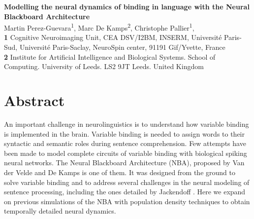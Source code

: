 \documentclass[10pt]{article}
\date{}
\begin{document}
\vspace*{0.2in}

\begin{flushleft} {\LARGE \textbf{Modelling the neural dynamics of
      binding in language with the Neural Blackboard Architecture} }
  \newline
  \\

  Martin Perez-Guevara\textsuperscript{1}, Marc De
  Kamps\textsuperscript{2}, Christophe Pallier\textsuperscript{1},
  \\
  \bigskip \textbf{1} Cognitive Neuroimaging Unit, CEA DSV/I2BM,
  INSERM, Université Paris-Sud, Université Paris-Saclay, NeuroSpin
  center, 91191 Gif/Yvette, France
  \\
  \textbf{2} Institute for Artificial Intelligence and Biological
  Systems. School of Computing. University of Leeds. LS2 9JT Leeds.
  United Kingdom
  \\
  \bigskip

\end{flushleft}


\section*{Abstract}

An important challenge in neurolinguistics is to understand how
variable binding is implemented in the brain. Variable binding is
needed to assign words to their syntactic and semantic roles during
sentence comprehension. Few attempts have been made to model complete
circuits of variable binding with biological spiking neural networks.
The Neural Blackboard Architecture (NBA), proposed by Van der Velde
and De Kamps \cite{van_der_Velde_2006} is one of them. It was designed
from the ground to solve variable binding and to address several
challenges in the neural modeling of sentence processing, including
the ones detailed by Jackendoff \cite{Jackendoff_2002b}. Here we
expand on previous simulations of the NBA with population density
techniques to obtain temporally detailed neural dynamics.
\end{document}
